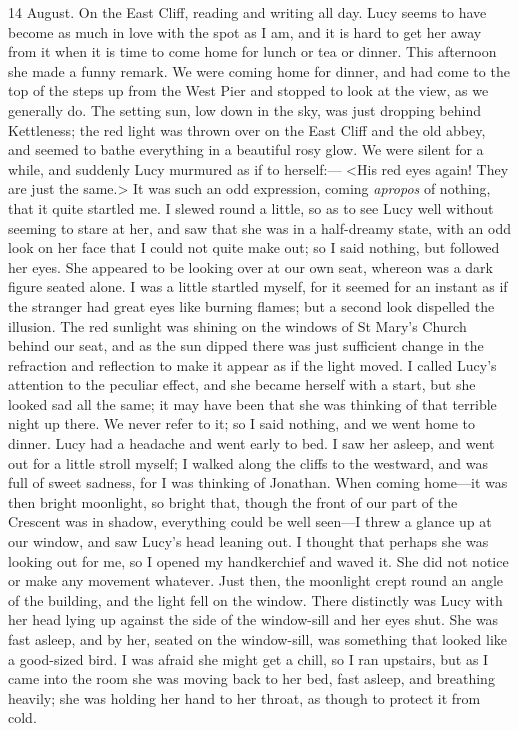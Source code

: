 \begin{diary}{14 August.}
On the East Cliff, reading and writing all day. Lucy seems to have become as much in love with the spot as I am, and it is hard to get her away from it when it is time to come home for lunch or tea or dinner. This afternoon she made a funny remark. We were coming home for dinner, and had come to the top of the steps up from the West Pier and stopped to look at the view, as we generally do. The setting sun, low down in the sky, was just dropping behind Kettleness; the red light was thrown over on the East Cliff and the old abbey, and seemed to bathe everything in a beautiful rosy glow. We were silent for a while, and suddenly Lucy murmured as if to herself:— <His red eyes again! They are just the same.> It was such an odd expression, coming \textit{apropos} of nothing, that it quite startled me. I slewed round a little, so as to see Lucy well without seeming to stare at her, and saw that she was in a half-dreamy state, with an odd look on her face that I could not quite make out; so I said nothing, but followed her eyes. She appeared to be looking over at our own seat, whereon was a dark figure seated alone. I was a little startled myself, for it seemed for an instant as if the stranger had great eyes like burning flames; but a second look dispelled the illusion. The red sunlight was shining on the windows of St Mary's Church behind our seat, and as the sun dipped there was just sufficient change in the refraction and reflection to make it appear as if the light moved. I called Lucy's attention to the peculiar effect, and she became herself with a start, but she looked sad all the same; it may have been that she was thinking of that terrible night up there. We never refer to it; so I said nothing, and we went home to dinner. Lucy had a headache and went early to bed. I saw her asleep, and went out for a little stroll myself; I walked along the cliffs to the westward, and was full of sweet sadness, for I was thinking of Jonathan. When coming home—it was then bright moonlight, so bright that, though the front of our part of the Crescent was in shadow, everything could be well seen—I threw a glance up at our window, and saw Lucy's head leaning out. I thought that perhaps she was looking out for me, so I opened my handkerchief and waved it. She did not notice or make any movement whatever. Just then, the moonlight crept round an angle of the building, and the light fell on the window. There distinctly was Lucy with her head lying up against the side of the window-sill and her eyes shut. She was fast asleep, and by her, seated on the window-sill, was something that looked like a good-sized bird. I was afraid she might get a chill, so I ran upstairs, but as I came into the room she was moving back to her bed, fast asleep, and breathing heavily; she was holding her hand to her throat, as though to protect it from cold.


\end{diary}
